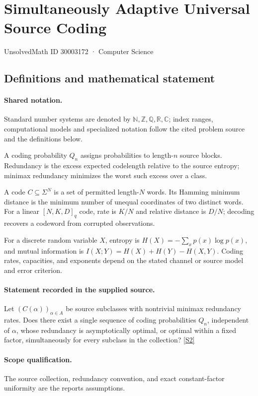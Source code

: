 \documentclass[11pt]{article}
\newcommand{\sref}[2]{\hyperlink{source:#1:#2}{[S#2]}}
\begin{document}
\setcounter{section}{30003171}
\section{Simultaneously Adaptive Universal Source Coding}\label{30003172}
{\small\sffamily UnsolvedMath ID 30003172 · Computer Science}
\subsection{Definitions and mathematical statement}

\paragraph{Shared notation.}Standard number systems are denoted by $\mathbb N,\mathbb Z,\mathbb Q,\mathbb R,\mathbb C$; index ranges, computational models and specialized notation follow the cited problem source and the definitions below.


A coding probability $Q_n$ assigns probabilities to length-$n$ source blocks. Redundancy is the excess expected codelength relative to the source entropy; minimax redundancy minimizes the worst such excess over a class.

A code $C\subseteq\Sigma^N$ is a set of permitted length-$N$ words. Its Hamming minimum distance is the minimum number of unequal coordinates of two distinct words. For a linear $[N,K,D]_q$ code, rate is $K/N$ and relative distance is $D/N$; decoding recovers a codeword from corrupted observations.

For a discrete random variable $X$, entropy is $H(X)=-\sum_xp(x)\log p(x)$, and mutual information is $I(X;Y)=H(X)+H(Y)-H(X,Y)$. Coding rates, capacities, and exponents depend on the stated channel or source model and error criterion.
\paragraph{Statement recorded in the supplied source.}
Let $(C(\alpha))_{\alpha\in A}$ be source subclasses with nontrivial minimax redundancy rates. Does there exist a single sequence of coding probabilities $Q_n$, independent of $\alpha$, whose redundancy is asymptotically optimal, or optimal within a fixed factor, simultaneously for every subclass in the collection? \sref{30003172}{2}
\paragraph{Scope qualification.}
The source collection, redundancy convention, and exact constant-factor uniformity are the report\textquotesingle s assumptions.
\end{document}
